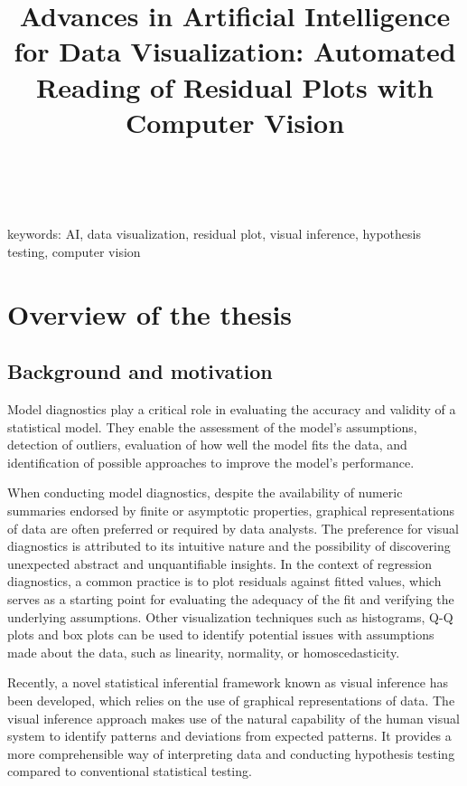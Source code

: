\documentclass[11pt,a4paper,]{article}
\title{Advances in Artificial Intelligence for Data Visualization: Automated Reading of Residual Plots with Computer Vision}
\author{\sf{\Large\textbf{Weihao (Patrick) Li}\\\large PhD student\\[0.5cm]}}
\date{\sf\Date~\Month~\Year}
\makeatletter
\def\titlepage{\front{\expandafter{\@title}}{\@author}{\@organization}}
\makeatother
\begin{document}
\titlepage

keywords:
AI, data visualization, residual plot, visual inference, hypothesis testing, computer vision

\hypertarget{overview-of-the-thesis}{%
\section{Overview of the thesis}\label{overview-of-the-thesis}}

\hypertarget{background-and-motivation}{%
\subsection{Background and motivation}\label{background-and-motivation}}

Model diagnostics play a critical role in evaluating the accuracy and validity of a statistical model. They enable the assessment of the model's assumptions, detection of outliers, evaluation of how well the model fits the data, and identification of possible approaches to improve the model's performance.

When conducting model diagnostics, despite the availability of numeric summaries endorsed by finite or asymptotic properties, graphical representations of data are often preferred or required by data analysts. The preference for visual diagnostics is attributed to its intuitive nature and the possibility of discovering unexpected abstract and unquantifiable insights. In the context of regression diagnostics, a common practice is to plot residuals against fitted values, which serves as a starting point for evaluating the adequacy of the fit and verifying the underlying assumptions. Other visualization techniques such as histograms, Q-Q plots and box plots can be used to identify potential issues with assumptions made about the data, such as linearity, normality, or homoscedasticity.

Recently, a novel statistical inferential framework known as visual inference \autocite{buja_statistical_2009} has been developed, which relies on the use of graphical representations of data. The visual inference approach makes use of the natural capability of the human visual system to identify patterns and deviations from expected patterns. It provides a more comprehensible way of interpreting data and conducting hypothesis testing compared to conventional statistical testing.
\end{document}
